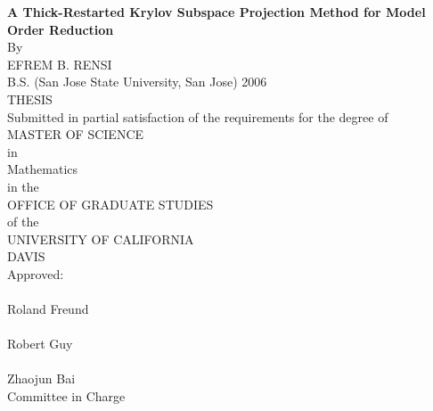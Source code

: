 

\begin{center}
   \null\vfill
   \textbf{%
      A Thick-Restarted Krylov Subspace Projection Method for Model Order Reduction 
   }%
   \\
   \bigskip
   By \\
   \bigskip
    EFREM B. RENSI \\
   \bigskip
   B.S. (San Jose State University, San Jose) 2006 \\
   \bigskip
   THESIS \\
   \bigskip
   Submitted in partial satisfaction of the requirements for the
   degree of \\
   \bigskip
   MASTER OF SCIENCE \\
   \bigskip
   in \\
   \bigskip
   Mathematics \\
   \bigskip
   in the \\
   \bigskip
   OFFICE OF GRADUATE STUDIES \\
   \bigskip        
   of the \\
   \bigskip
   UNIVERSITY OF CALIFORNIA \\
   \bigskip
   DAVIS \\
   \bigskip
   Approved: \\
   \bigskip
   \bigskip
   \makebox[3in]{\hrulefill} \\
   Roland Freund\\
   \bigskip
   \bigskip
   \makebox[3in]{\hrulefill} \\
   Robert Guy \\
   \bigskip
   \bigskip
   \makebox[3in]{\hrulefill} \\
   Zhaojun Bai \\
   \bigskip
   Committee in Charge \\
    \\
   \vfill
\end{center}
